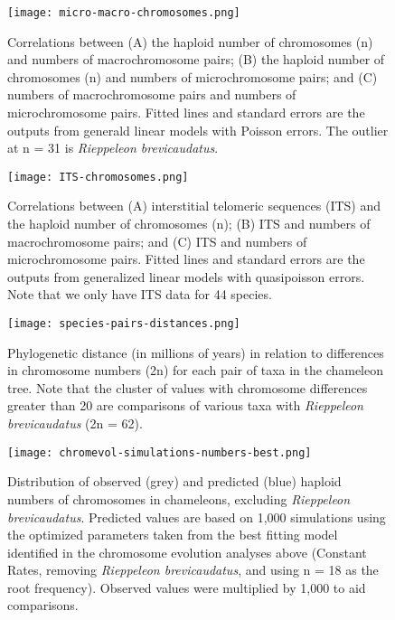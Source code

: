 \documentclass[a4paper, 12pt]{article}
\begin{document}
\newpage
\begin{figure}[h]
 \centering
  \texttt{[image: micro-macro-chromosomes.png]}
  \caption{Correlations between (A) the haploid number of chromosomes (n) and numbers of macrochromosome pairs; (B) the haploid number of chromosomes (n) and numbers of microchromosome pairs; and (C) numbers of macrochromosome pairs and numbers of microchromosome pairs. Fitted lines and standard errors are the outputs from generald linear models with Poisson errors. The outlier at n = 31 is \textit{Rieppeleon brevicaudatus}.
}
  \label{fig-chroms}
\end{figure}

\newpage
\begin{figure}[h]
 \centering
  \texttt{[image: ITS-chromosomes.png]}
  \caption{Correlations between (A) interstitial telomeric sequences (ITS) and the haploid number of chromosomes (n); (B) ITS and numbers of macrochromosome pairs; and (C) ITS and numbers of microchromosome pairs. Fitted lines and standard errors are the outputs from generalized linear models with quasipoisson errors. Note that we only have ITS data for 44 species.
}
  \label{fig-its}
\end{figure}

\newpage
\begin{figure}[h]
 \centering
  \texttt{[image: species-pairs-distances.png]}
  \caption{Phylogenetic distance (in millions of years) in relation to differences in chromosome numbers (2n) for each pair of taxa in the chameleon tree. Note that the cluster of values with chromosome differences greater than 20 are comparisons of various taxa with \textit{Rieppeleon brevicaudatus} (2n = 62).}
  \label{fig-pairwise}
\end{figure}

\newpage
\begin{figure}[h]
 \centering
  \texttt{[image: chromevol-simulations-numbers-best.png]}
  \caption{Distribution of observed (grey) and predicted (blue) haploid numbers of chromosomes in chameleons, excluding \textit{Rieppeleon brevicaudatus}. Predicted values are based on 1,000 simulations using the optimized parameters taken from the best fitting model identified in the chromosome evolution analyses above (Constant Rates, removing \textit{Rieppeleon brevicaudatus}, and using n = 18 as the root frequency). Observed values were multiplied by 1,000 to aid comparisons.
}
  \label{fig-predict}
\end{figure} 
\end{document}
